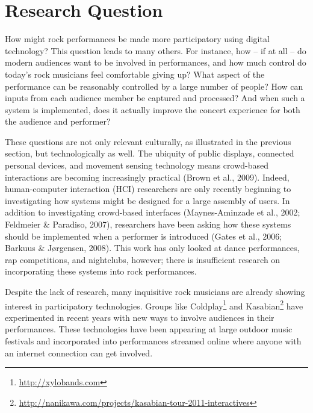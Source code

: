 \section{Research Question}

How might rock performances be made more participatory using digital technology? This question leads to many others. For instance, how -- if at all -- do modern audiences want to be involved in performances, and how much control do today's rock musicians feel comfortable giving up? What aspect of the performance can be reasonably controlled by a large number of people? How can inputs from each audience member be captured and processed? And when such a system is implemented, does it actually improve the concert experience for both the audience and performer?

These questions are not only relevant culturally, as illustrated in the previous section, but technologically as well. The ubiquity of public displays, connected personal devices, and movement sensing technology means crowd-based interactions are becoming increasingly practical (Brown et al., 2009). Indeed, human-computer interaction (HCI) researchers are only recently beginning to investigating how systems might be designed for a large assembly of users. In addition to investigating crowd-based interfaces (Maynes-Aminzade et al., 2002; Feldmeier \& Paradiso, 2007), researchers have been asking how these systems should be implemented when a performer is introduced (Gates et al., 2006; Barkuus \& J{\o}rgensen, 2008). This work has only looked at dance performances, rap competitions, and nightclubs, however; there is insufficient research on incorporating these systems into rock performances.

Despite the lack of research, many inquisitive rock musicians are already showing interest in participatory technologies. Groups like Coldplay\footnote{\url{http://xylobands.com}} and Kasabian\footnote{\url{http://nanikawa.com/projects/kasabian-tour-2011-interactives}} have experimented in recent years with new ways to involve audiences in their performances. These technologies have been appearing at large outdoor music festivals and incorporated into performances streamed online where anyone with an internet connection can get involved.


